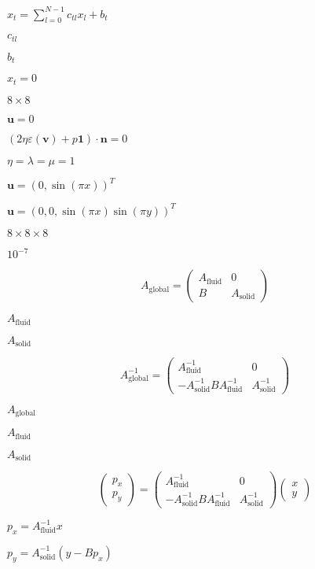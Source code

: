 \documentclass{article}
\begin{document}
$x_t=\sum_{l=0}^{N-1} c_{tl} x_l + b_t$
\pagebreak

$c_{tl}$
\pagebreak

$b_t$
\pagebreak

$x_t=0$
\pagebreak

$8\times 8$
\pagebreak

$\mathbf u=0$
\pagebreak

$(2\eta \varepsilon(\mathbf v) + p \mathbf 1) \cdot \mathbf n = 0$
\pagebreak

$\eta=\lambda=\mu=1$
\pagebreak

$\mathbf u=(0, \sin(\pi x))^T$
\pagebreak

$\mathbf u=(0, 0, \sin(\pi x)\sin(\pi y))^T$
\pagebreak

$8\times 8\times 8$
\pagebreak

$10^{-7}$
\pagebreak

\[ A_\text{global} = \begin{pmatrix} A_{\text{fluid}} & 0 \\ B & A_{\text{solid}} \end{pmatrix} \]
\pagebreak

$A_{\text{fluid}}$
\pagebreak

$A_{\text{solid}}$
\pagebreak

\[ A_\text{global}^{-1} = \begin{pmatrix} A_{\text{fluid}}^{-1} & 0 \\ -A_\text{solid}^{-1} B A_\text{fluid}^{-1} & A_{\text{solid}}^{-1} \end{pmatrix} \]
\pagebreak

$A_\text{global}$
\pagebreak

$A_\text{fluid}$
\pagebreak

$A_\text{solid}$
\pagebreak

\[ \begin{pmatrix} p_x \\ p_y \end{pmatrix} = \begin{pmatrix} A_{\text{fluid}}^{-1} & 0 \\ -A_\text{solid}^{-1} B A_\text{fluid}^{-1} & A_{\text{solid}}^{-1} \end{pmatrix} \begin{pmatrix} x \\ y \end{pmatrix} \]
\pagebreak

$p_x = A_{\text{fluid}}^{-1} x$
\pagebreak

$p_y = A_{\text{solid}}^{-1} (y-Bp_x)$
\pagebreak
\end{document}
